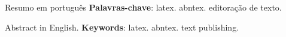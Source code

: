 \documentclass[12pt,oneside,a4paper,english,brazil]{abntex2}
\begin{document}
\frenchspacing

\pretextual
\imprimircapa
\imprimirfolhaderosto

\begin{resumo}
  Resumo em português
  \vspace{\onelineskip}
  \noindent
  \textbf{Palavras-chave}: latex. abntex. editoração de texto.
\end{resumo}
\begin{resumo}[Abstract]
  Abstract in English.
  \vspace{\onelineskip}
  \noindent
  \textbf{Keywords}: latex. abntex. text publishing.
\end{resumo}

\tableofcontents*
\cleardoublepage

\textual
\cleardoublepage






\postextual

\end{document}
